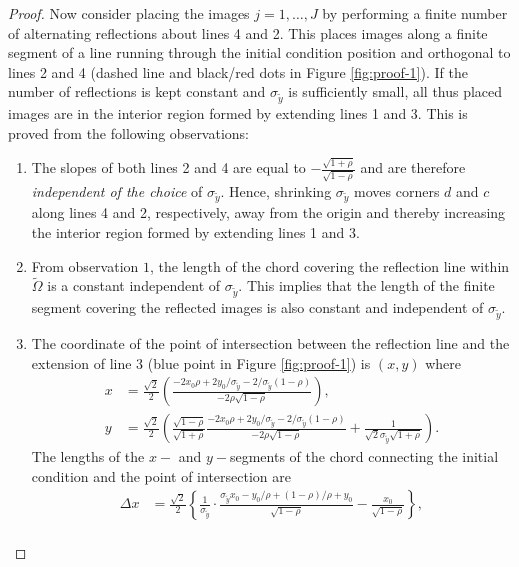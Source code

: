 \begin{proof}
  Now consider placing the images $j = 1, \ldots, J$ by performing a
  finite number of alternating reflections about lines 4 and 2. This
  places images along a finite segment of a line running through the
  initial condition position and orthogonal to lines 2 and 4 (dashed line and
  black/red dots in Figure \ref{fig:proof-1}). If the number of
  reflections is kept constant and $\sigma_{\tilde{y}}$ is sufficiently
  small, all thus placed images are in the interior region
  formed by extending lines 1 and 3. This is proved from the following
  observations:
  \begin{enumerate}
  \item The slopes of both lines 2 and 4 are equal to
    $-\frac{\sqrt{1+\rho}}{\sqrt{1-\rho}}$ and are therefore
    \textit{independent of the choice} of $\sigma_{\tilde{y}}$. Hence,
    shrinking $\sigma_{\tilde{y}}$ moves corners $d$ and $c$ along
    lines 4 and 2, respectively, away from the origin and thereby
    increasing the interior region formed by extending lines 1 and 3.
  \item From observation $1$, the length of the chord covering the
    reflection line within $\tilde{\Omega}$ is a constant independent of
    $\sigma_{\tilde{y}}$.  This implies that the length of the finite
    segment covering the reflected images is also constant and
    independent of $\sigma_{\tilde{y}}$.
  \item The coordinate of the point of intersection between the
    reflection line and the extension of line 3 (blue point in Figure
    \ref{fig:proof-1}) is $(x,y)$ where
    \begin{align*}
      x &= \frac{\sqrt{2}}{2} \left( \frac{-2 x_0\rho + 2
      y_0/\sigma_{\tilde{y}} -
      2/\sigma_{\tilde{y}}(1-\rho)}{-2\rho\sqrt{1-\rho}}\right), \\
      y &= \frac{\sqrt{2}}{2} \left( \frac{\sqrt{1-\rho}}{\sqrt{1+\rho}}\frac{-2 x_0\rho + 2
      y_0/\sigma_{\tilde{y}} -
      2/\sigma_{\tilde{y}}(1-\rho)}{-2\rho\sqrt{1-\rho}} +
      \frac{1}{\sqrt{2}\sigma_{\tilde{y}}\sqrt{1+\rho}} \right).
    \end{align*}
    The lengths of the $x-$ and $y-$segments of the chord connecting
    the initial condition and the point of intersection are
    \begin{align*}
      \Delta x &= \frac{\sqrt{2}}{2}\left\{ \frac{1}{\sigma_{\tilde{y}}}\cdot\frac{\sigma_{\tilde{y}}x_0 - y_0/\rho + (1-\rho)/\rho + y_0}{\sqrt{1-\rho}} - \frac{x_0}{\sqrt{1-\rho}} \right\},\\

\end{align*}
\end{enumerate}
\end{proof}
